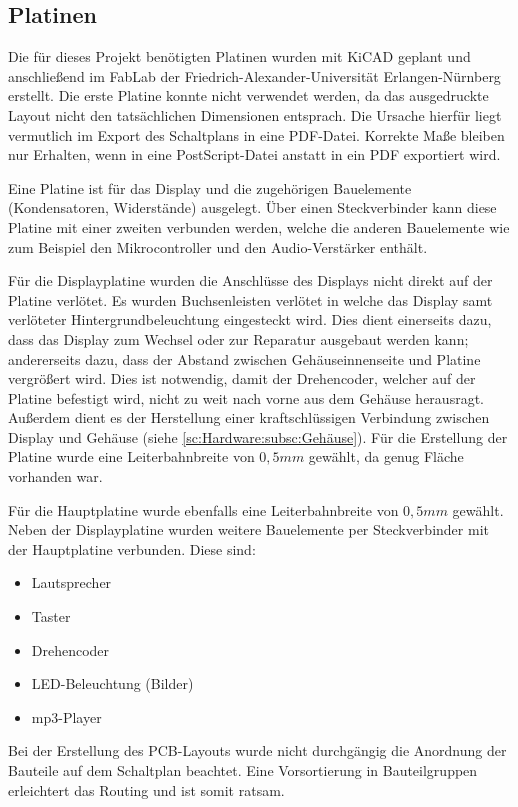 \documentclass[journal, a4paper]{IEEEtran}
\begin{document}
	\subsection{Platinen}
		\label{sc:Hardware:subsc:Platinen}
		Die für dieses Projekt benötigten Platinen wurden mit KiCAD geplant und anschließend im FabLab der Friedrich-Alexander-Universität Erlangen-Nürnberg erstellt. Die erste Platine konnte nicht verwendet werden, da das ausgedruckte Layout nicht den tatsächlichen Dimensionen entsprach. Die Ursache hierfür liegt vermutlich im Export des Schaltplans in eine PDF-Datei. Korrekte Maße bleiben nur Erhalten, wenn in eine PostScript-Datei anstatt in ein PDF exportiert wird.\par Eine Platine ist für das Display und die zugehörigen Bauelemente (Kondensatoren, Widerstände) ausgelegt. Über einen Steckverbinder kann diese Platine mit einer zweiten verbunden werden, welche die anderen Bauelemente wie zum Beispiel den Mikrocontroller und den Audio-Verstärker enthält. \par
		Für die Displayplatine wurden die Anschlüsse des Displays nicht direkt auf der Platine verlötet. Es wurden Buchsenleisten verlötet in welche das Display samt verlöteter Hintergrundbeleuchtung eingesteckt wird. Dies dient einerseits dazu, dass das Display zum Wechsel oder zur Reparatur ausgebaut werden kann; andererseits dazu, dass der Abstand zwischen Gehäuseinnenseite und Platine vergrößert wird. Dies ist notwendig, damit der Drehencoder, welcher auf der Platine befestigt wird, nicht zu weit nach vorne aus dem Gehäuse herausragt. Außerdem dient es der Herstellung einer kraftschlüssigen Verbindung zwischen Display und Gehäuse (siehe \ref{sc:Hardware:subsc:Gehäuse}).  Für die Erstellung der Platine wurde eine Leiterbahnbreite von $0,5mm$ gewählt, da genug Fläche vorhanden war.\par
		Für die Hauptplatine wurde ebenfalls eine Leiterbahnbreite von $0,5mm$ gewählt. Neben der Displayplatine wurden weitere Bauelemente per Steckverbinder mit der Hauptplatine verbunden. Diese sind:
		\begin{itemize}
			\item Lautsprecher
			\item Taster
			\item Drehencoder
			\item LED-Beleuchtung (Bilder)
			\item mp3-Player
		\end{itemize}
		Bei der Erstellung des PCB-Layouts wurde nicht durchgängig die Anordnung der Bauteile auf dem Schaltplan beachtet. Eine Vorsortierung in Bauteilgruppen erleichtert das Routing und ist somit ratsam.
\end{document}
